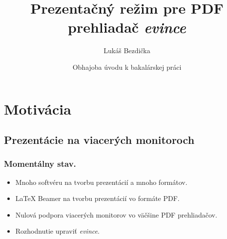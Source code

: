 \documentclass{beamer}
\title[Prezentačný mód evince] %
{Prezentačný režim pre PDF prehliadač \emph{evince}}
\author[Bezdička L.] %
{Lukáš Bezdička\inst{1}}
\institute[FI MUNI] %
{
  \inst{1}%
  Fakulta Informatiky\\
  Masarykova Univerzita
}
\date[Jar 2011] %
{Obhajoba úvodu k bakalárskej práci}
\begin{document}
\begin{frame}
  \titlepage
\end{frame}






\section{Motivácia}

\subsection{Prezentácie na viacerých monitoroch}

\begin{frame}
  \frametitle{Momentálny stav.}

  \begin{itemize}
  \item
    Mnoho softvéru na tvorbu prezentácií a mnoho formátov. 
    \pause
  \item
    LaTeX Beamer na tvorbu prezentácií vo formáte PDF. 
    \pause
  \item
    Nulová podpora viacerých monitorov vo väčšine PDF prehliadačov. 
    \pause
  \item
    Rozhodnutie upraviť \emph{evince}.
  \end{itemize}
\end{frame}
\end{document}
